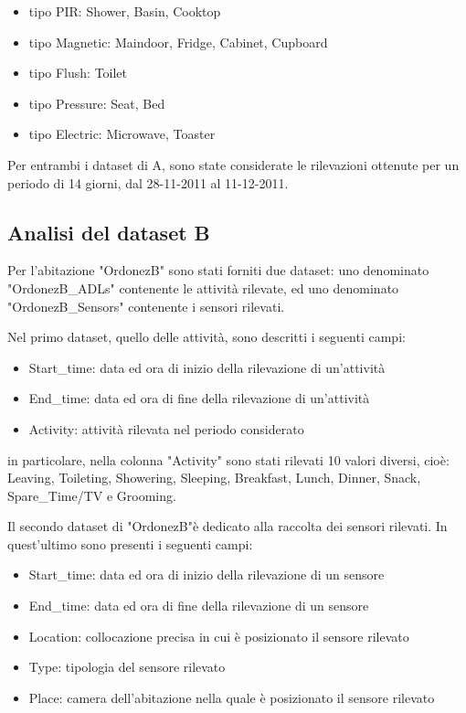 \documentclass[10pt,a4paper]{article}
\begin{document}
	\begin{itemize}
		\item tipo PIR: Shower, Basin, Cooktop
		\item tipo Magnetic: Maindoor, Fridge, Cabinet, Cupboard
		\item  tipo Flush: Toilet
		\item tipo Pressure: Seat, Bed
		\item tipo Electric: Microwave, Toaster
	\end{itemize}
	
	Per entrambi i dataset di A, sono state considerate le rilevazioni ottenute per un periodo di 14 giorni, dal 28-11-2011 al 11-12-2011.
	
	\subsection{Analisi del dataset B}
	
	Per l'abitazione "OrdonezB" sono stati forniti due dataset: uno denominato "OrdonezB\_ADLs" contenente le attività rilevate, ed uno denominato  "OrdonezB\_Sensors"	 contenente i sensori rilevati.
	
	Nel primo dataset, quello delle attività, sono descritti i seguenti campi:
	
	\begin{itemize}
		\item Start\_time: data ed ora di inizio della rilevazione di un'attività
		\item End\_time: data ed ora di fine della rilevazione di un'attività
		\item  Activity: attività rilevata nel periodo considerato
	\end{itemize}
	
	in particolare, nella colonna "Activity" sono stati rilevati 10 valori diversi, cioè: Leaving, Toileting, Showering, Sleeping, Breakfast, Lunch, Dinner, Snack, Spare\_Time/TV e Grooming. 
	
	Il secondo dataset di "OrdonezB"è dedicato alla raccolta dei sensori rilevati. In quest'ultimo sono presenti i seguenti campi:
	\begin{itemize}
		\item Start\_time: data ed ora di inizio della rilevazione di un sensore
		\item End\_time: data ed ora di fine della rilevazione di un sensore
		\item  Location: collocazione precisa in cui è posizionato il sensore rilevato
		\item Type: tipologia del sensore rilevato
		\item Place: camera dell'abitazione nella quale è posizionato il sensore rilevato
	\end{itemize}
	
\end{document}
